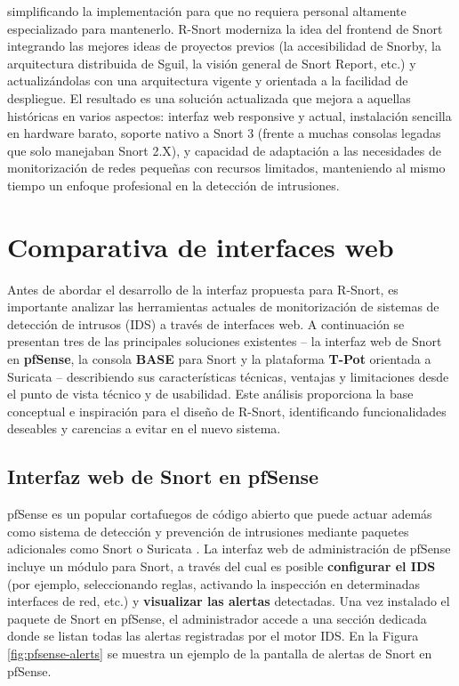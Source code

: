 \documentclass[11pt,a4paper,twoside]{report}
\begin{document}
simplificando la implementación para que no requiera personal altamente especializado para mantenerlo. R-Snort moderniza la idea del frontend de Snort integrando las mejores ideas de proyectos previos (la accesibilidad de Snorby, la arquitectura distribuida de Sguil, la visión general de Snort Report, etc.) y actualizándolas con una arquitectura vigente y orientada a la facilidad de despliegue. El resultado es una solución actualizada que mejora a aquellas históricas en varios aspectos: interfaz web responsive y actual, instalación sencilla en hardware barato, soporte nativo a Snort 3 (frente a muchas consolas legadas que solo manejaban Snort 2.X), y capacidad de adaptación a las necesidades de monitorización de redes pequeñas con recursos limitados, manteniendo al mismo tiempo un enfoque profesional en la detección de intrusiones.

\section{Comparativa de interfaces web}
Antes de abordar el desarrollo de la interfaz propuesta para R-Snort, es importante analizar las herramientas actuales de monitorización de sistemas de detección de intrusos (IDS) a través de interfaces web. A continuación se presentan tres de las principales soluciones existentes -- la interfaz web de Snort en \textbf{pfSense}, la consola \textbf{BASE} para Snort y la plataforma \textbf{T-Pot} orientada a Suricata -- describiendo sus características técnicas, ventajas y limitaciones desde el punto de vista técnico y de usabilidad. Este análisis proporciona la base conceptual e inspiración para el diseño de R-Snort, identificando funcionalidades deseables y carencias a evitar en el nuevo sistema.\newline

\subsection{Interfaz web de Snort en pfSense}
pfSense es un popular cortafuegos de código abierto que puede actuar además como sistema de detección y prevención de intrusiones mediante paquetes adicionales como Snort o Suricata \cite{pfsense}. La interfaz web de administración de pfSense incluye un módulo para Snort, a través del cual es posible \textbf{configurar el IDS} (por ejemplo, seleccionando reglas, activando la inspección en determinadas interfaces de red, etc.) y \textbf{visualizar las alertas} detectadas. Una vez instalado el paquete de Snort en pfSense, el administrador accede a una sección dedicada donde se listan todas las alertas registradas por el motor IDS. En la Figura \ref{fig:pfsense-alerts} se muestra un ejemplo de la pantalla de alertas de Snort en pfSense.\newline
\end{document}
